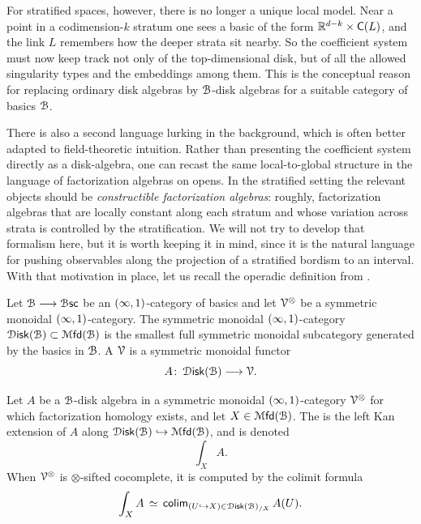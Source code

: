 For stratified spaces, however, there is no longer a unique local model. Near a point in a codimension-$k$ stratum one sees a basic of the form $\mathbb R^{d-k}\times \mathsf C(L)$, and the link $L$ remembers how the deeper strata sit nearby. So the coefficient system must now keep track not only of the top-dimensional disk, but of all the allowed singularity types and the embeddings among them. This is the conceptual reason for replacing ordinary disk algebras by $\mathcal B$-disk algebras for a suitable category of basics $\mathcal B$.

There is also a second language lurking in the background, which is often better adapted to field-theoretic intuition. Rather than presenting the coefficient system directly as a disk-algebra, one can recast the same local-to-global structure in the language of factorization algebras on opens. In the stratified setting the relevant objects should be \emph{constructible factorization algebras}: roughly, factorization algebras that are locally constant along each stratum and whose variation across strata is controlled by the stratification. We will not try to develop that formalism here, but it is worth keeping it in mind, since it is the natural language for pushing observables along the projection of a stratified bordism to an interval. With that motivation in place, let us recall the operadic definition from \cite{AFT3}.

\begin{definition}\cite[Definition~2.2 and Notation~2.9]{AFT3}
    Let $\mathcal B \longrightarrow \operatorname{\mathcal B\mathsf{sc}}$ be an $(\operatorname{\infty},1)$-category of basics and let $\mathcal V^{\otimes}$ be a symmetric monoidal $(\operatorname{\infty},1)$-category. The symmetric monoidal $(\operatorname{\infty},1)$-category $\operatorname{\mathcal D{\mathsf{isk}}}(\mathcal B)\subset \operatorname{{\mathcal M}\mathsf{fd}}(\mathcal B)$ is the smallest full symmetric monoidal subcategory generated by the basics in $\mathcal B$. A  $\mathcal V$ is a symmetric monoidal functor
    \begin{equation}
        A \colon \operatorname{\mathcal D{\mathsf{isk}}}(\mathcal B) \longrightarrow \mathcal V.
    \end{equation}
\end{definition}

\begin{definition}\cite[Definition~2.14 and Theorem~2.15]{AFT3}
    Let $A$ be a $\mathcal B$-disk algebra in a symmetric monoidal $(\operatorname{\infty},1)$-category $\mathcal V^{\otimes}$ for which factorization homology exists, and let $X\in \operatorname{{\mathcal M}\mathsf{fd}}(\mathcal B)$. The  is the left Kan extension of $A$ along $\operatorname{\mathcal D{\mathsf{isk}}}(\mathcal B)\hookrightarrow \operatorname{{\mathcal M}\mathsf{fd}}(\mathcal B)$, and is denoted
    \begin{equation}
        \int_{X} A.
    \end{equation}
    When $\mathcal V^{\otimes}$ is $\otimes$-sifted cocomplete, it is computed by the colimit formula
    \begin{equation}
        \int_{X} A \,\simeq\, \operatorname{{\sf colim}}_{(U\hookrightarrow X)\in \operatorname{\mathcal D{\mathsf{isk}}}(\mathcal B)_{/X}} A(U).
    \end{equation}
\end{definition}


